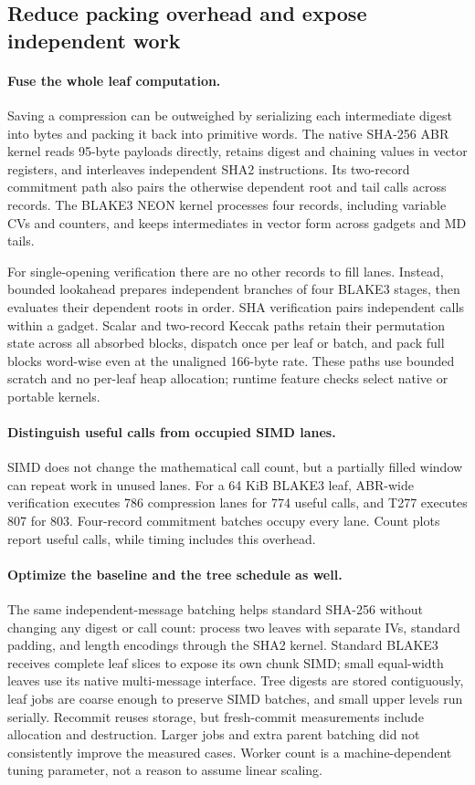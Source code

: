 \documentclass[11pt,letterpaper]{article}
\theoremstyle{definition} %
\begin{document}
\subsection{Reduce packing overhead and expose independent work}
\paragraph{Fuse the whole leaf computation.}
Saving a compression can be outweighed by serializing each intermediate
digest into bytes and packing it back into primitive words. The native
SHA-256 ABR kernel reads 95-byte payloads directly, retains digest and
chaining values in vector registers, and interleaves independent SHA2
instructions. Its two-record commitment path also pairs the otherwise
dependent root and tail calls across records. The BLAKE3 NEON kernel
processes four records, including variable CVs and counters, and keeps
intermediates in vector form across gadgets and MD tails.

For single-opening verification there are no other records to fill lanes.
Instead, bounded lookahead prepares independent branches of four BLAKE3
stages, then evaluates their dependent roots in order. SHA verification
pairs independent calls within a gadget. Scalar and two-record Keccak
paths retain their permutation state across all absorbed blocks, dispatch
once per leaf or batch, and pack full blocks word-wise even at the
unaligned 166-byte rate. These paths use bounded scratch and no per-leaf
heap allocation; runtime feature checks select native or portable kernels.

\paragraph{Distinguish useful calls from occupied SIMD lanes.}
SIMD does not change the mathematical call count, but a partially filled
window can repeat work in unused lanes. For a 64 KiB BLAKE3 leaf, ABR-wide
verification executes 786 compression lanes for 774 useful calls, and
T277 executes 807 for 803. Four-record commitment batches occupy every
lane. Count plots report useful calls, while timing includes this overhead.

\paragraph{Optimize the baseline and the tree schedule as well.}
The same independent-message batching helps standard SHA-256 without
changing any digest or call count: process two leaves with separate IVs,
standard padding, and length encodings through the SHA2 kernel. Standard
BLAKE3 receives complete leaf slices to expose its own chunk SIMD; small
equal-width leaves use its native multi-message interface. Tree digests
are stored contiguously, leaf jobs are coarse enough to preserve SIMD
batches, and small upper levels run serially. Recommit reuses storage,
but fresh-commit measurements include allocation and destruction.
Larger jobs and extra parent batching did not consistently improve the
measured cases. Worker count is a machine-dependent tuning parameter,
not a reason to assume linear scaling.
\end{document}
